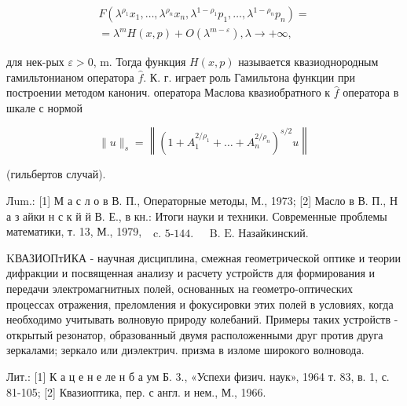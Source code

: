 \documentclass[10pt]{article}
\begin{document}
\[

\begin{gathered}

F\left(\lambda^{\rho_{1}} x_{1}, \ldots, \lambda^{\rho_{n}} x_{n}, \lambda^{1-\rho_{1}} p_{1}, \ldots, \lambda^{1-\rho_{n}} p_{n}\right)= \\

=\lambda^{m} H(x, p)+O\left(\lambda^{m-\varepsilon}\right), \lambda \rightarrow+\infty,

\end{gathered}

\]



для нек-рых $\varepsilon>0$, m. Тогда функция $H(x, p)$ называется квазиоднородным гамильтонианом оператора $\hat{f}$. К. г. играет роль Гамильтона функции при построении методом канонич. оператора Маслова квазиобратного к $\hat{f}$ оператора в шкале с нормой



\[

\|u\|_{s}=\left\|\left(1+A_{1}^{2 / \rho_{1}}+\ldots+A_{n}^{2 / \rho_{n}}\right)^{s / 2} u\right\|

\]



(гильбертов случай).



Лum.: [1] М а с л о в В. П., Операторные методы, М., 1973; [2] Масло в В. П., Н а з айки н с к й й В. Е., в кн.: Итоги науки и техники. Современные проблемы математики, т. 13, М., 1979, $\begin{array}{ll}\text { c. 5-144. } & \text { B. E. Назайкинский. }\end{array}$



KВАЗИОПтИКА - научная дисциплина, смежная геометрической оптике и теории дифракции и посвященная анализу и расчету устройств для формирования и передачи электромагнитных полей, основанных на геометро-оптических процессах отражения, преломления и фокусировки этих полей в условиях, когда необходимо учитывать волновую природу колебаний. Примеры таких устройств - открытый резонатор, образованный двумя расположенными друг против друга зеркалами; зеркало или диэлектрич. призма в изломе широкого волновода.



Лит.: [1] К а ц е н е ле н б а ум Б. 3., «Успехи физич. наук», 1964 т. 83, в. 1, с. 81-105; [2] Квазиоптика, пер. с англ. и нем., М., 1966.
\end{document}
